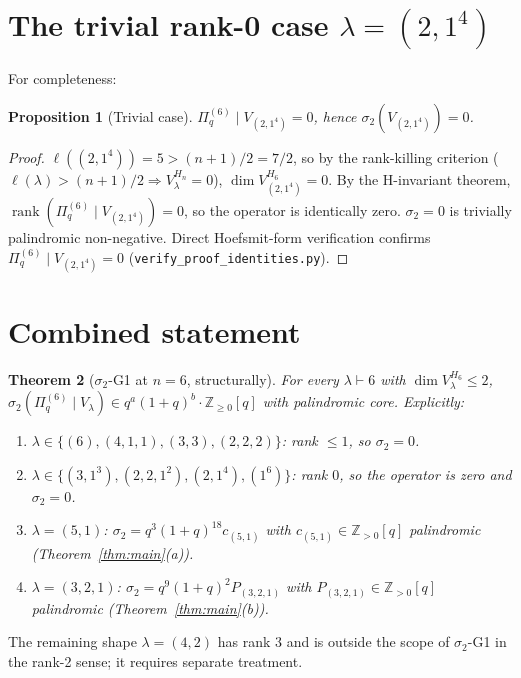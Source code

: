 \documentclass[11pt]{article}
\theoremstyle{plain}
\newtheorem{theorem}{Theorem}
\newtheorem{proposition}[theorem]{Proposition}
\theoremstyle{definition}
\theoremstyle{remark}
\newcommand{\Z}{\mathbb{Z}}
\newcommand{\Pibs}{\Pi_q}
\begin{document}
\section{The trivial rank-0 case $\lambda = (2,1^4)$}

For completeness:

\begin{proposition}[Trivial case]\label{prop:trivial}
$\Pibs^{(6)} \mid V_{(2,1^4)} = 0$, hence $\sigma_2(V_{(2,1^4)}) = 0$.
\end{proposition}

\begin{proof}
$\ell((2,1^4)) = 5 > (n+1)/2 = 7/2$, so by the rank-killing criterion
($\ell(\lambda) > (n+1)/2 \Rightarrow V_\lambda^{H_n} = 0$),
$\dim V_{(2,1^4)}^{H_6} = 0$. By the H-invariant theorem,
$\operatorname{rank}(\Pibs^{(6)}\mid V_{(2,1^4)}) = 0$, so the operator
is identically zero. $\sigma_2 = 0$ is trivially palindromic non-negative.
Direct Hoefsmit-form verification confirms
$\Pibs^{(6)} \mid V_{(2,1^4)} = 0$ (\verb|verify_proof_identities.py|).
\end{proof}

\section{Combined statement}

\begin{theorem}[$\sigma_2$-G1 at $n=6$, structurally]\label{thm:combined}
For every $\lambda \vdash 6$ with $\dim V_\lambda^{H_6} \leq 2$,
$\sigma_2(\Pibs^{(6)}\mid V_\lambda) \in q^a (1+q)^b \cdot \Z_{\geq 0}[q]$
with palindromic core. Explicitly:
\begin{enumerate}[label=(\arabic*),itemsep=0pt]
\item $\lambda \in \{(6),(4,1,1),(3,3),(2,2,2)\}$: rank $\leq 1$, so $\sigma_2 = 0$.
\item $\lambda \in \{(3,1^3),(2,2,1^2),(2,1^4),(1^6)\}$: rank $0$, so the
operator is zero and $\sigma_2 = 0$.
\item $\lambda = (5,1)$: $\sigma_2 = q^3(1+q)^{18}c_{(5,1)}$ with
$c_{(5,1)} \in \Z_{>0}[q]$ palindromic (Theorem~\ref{thm:main}(a)).
\item $\lambda = (3,2,1)$: $\sigma_2 = q^9(1+q)^2 P_{(3,2,1)}$ with
$P_{(3,2,1)} \in \Z_{>0}[q]$ palindromic (Theorem~\ref{thm:main}(b)).
\end{enumerate}
\end{theorem}

The remaining shape $\lambda = (4,2)$ has rank $3$ and is outside the
scope of $\sigma_2$-G1 in the rank-2 sense; it requires separate
treatment.
\end{document}
